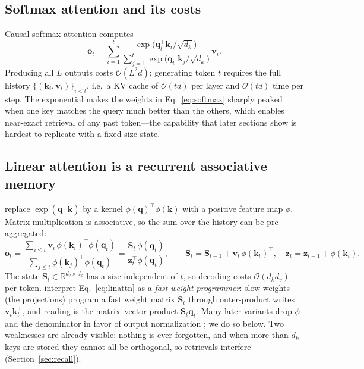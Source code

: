 \documentclass[a4paper]{article}
\newcommand{\R}{\mathbb{R}}
\newcommand{\T}{^{\top}}
\newcommand{\vq}{\mathbf{q}}
\newcommand{\vk}{\mathbf{k}}
\newcommand{\vv}{\mathbf{v}}
\newcommand{\vo}{\mathbf{o}}
\newcommand{\mS}{\mathbf{S}}
\newcommand{\bigO}{\mathcal{O}}
\theoremstyle{plain}
\theoremstyle{remark}
\begin{document}
\subsection{Softmax attention and its costs}
Causal softmax attention computes
\begin{equation}
\label{eq:softmax}
\vo_t=\sum_{i=1}^{t}\frac{\exp\!\big(\vq_t\T\vk_i/\sqrt{d_k}\big)}{\sum_{j=1}^{t}\exp\!\big(\vq_t\T\vk_j/\sqrt{d_k}\big)}\,\vv_i .
\end{equation}
Producing all $L$ outputs costs $\bigO(L^2 d)$; generating token $t$ requires the full history $\{(\vk_i,\vv_i)\}_{i<t}$, i.e.\ a KV cache of $\bigO(td)$ per layer and $\bigO(td)$ time per step. The exponential makes the weights in Eq.~\eqref{eq:softmax} sharply peaked when one key matches the query much better than the others, which enables near-exact retrieval of any past token---the capability that later sections show is hardest to replicate with a fixed-size state.

\subsection{Linear attention is a recurrent associative memory}
\citet{katharopoulos2020transformers} replace $\exp(\vq\T\vk)$ by a kernel $\phi(\vq)\T\phi(\vk)$ with a positive feature map $\phi$. Matrix multiplication is associative, so the sum over the history can be pre-aggregated:
\begin{equation}
\label{eq:linattn}
\vo_t=\frac{\sum_{i\le t}\vv_i\,\phi(\vk_i)\T\phi(\vq_t)}{\sum_{j\le t}\phi(\vk_j)\T\phi(\vq_t)}
=\frac{\mS_t\,\phi(\vq_t)}{\mathbf{z}_t\T\phi(\vq_t)},\qquad
\mS_t=\mS_{t-1}+\vv_t\,\phi(\vk_t)\T,\quad \mathbf{z}_t=\mathbf{z}_{t-1}+\phi(\vk_t).
\end{equation}
The state $\mS_t\in\R^{d_v\times d_k}$ has a size independent of $t$, so decoding costs $\bigO(d_kd_v)$ per token. \citet{schlag2021linear} interpret Eq.~\eqref{eq:linattn} as a \emph{fast-weight programmer}: slow weights (the projections) program a fast weight matrix $\mS_t$ through outer-product writes $\vv_t\vk_t\T$, and reading is the matrix--vector product $\mS_t\vq_t$. Many later variants drop $\phi$ and the denominator in favor of output normalization \citep{sun2023retnet,yang2024gla}; we do so below. Two weaknesses are already visible: nothing is ever forgotten, and when more than $d_k$ keys are stored they cannot all be orthogonal, so retrievals interfere (Section~\ref{sec:recall}).
\end{document}
